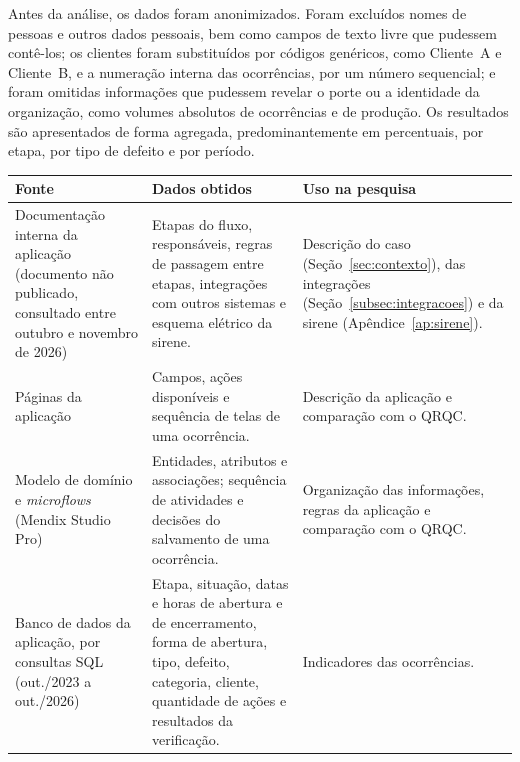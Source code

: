 Antes da análise, os dados foram anonimizados. Foram excluídos nomes de pessoas e outros dados pessoais, bem como campos de texto livre que pudessem contê-los; os clientes foram substituídos por códigos genéricos, como Cliente~A e Cliente~B, e a numeração interna das ocorrências, por um número sequencial; e foram omitidas informações que pudessem revelar o porte ou a identidade da organização, como volumes absolutos de ocorrências e de produção. Os resultados são apresentados de forma agregada, predominantemente em percentuais, por etapa, por tipo de defeito e por período.

\begin{quadro}[htb]
    \centering
    \caption{Fontes de evidência e dados coletados}
    \label{quad:fontes}
    \footnotesize
    \begin{tabularx}{\textwidth}{|>{\raggedright\arraybackslash}p{3.4cm}
                                    |>{\raggedright\arraybackslash}X
                                    |>{\raggedright\arraybackslash}p{3.4cm}|}
        \hline
        \textbf{Fonte} & \textbf{Dados obtidos} & \textbf{Uso na pesquisa} \\
        \hline
        Documentação interna da aplicação (documento não publicado, consultado entre outubro e novembro de 2026) & Etapas do fluxo, responsáveis, regras de passagem entre etapas, integrações com outros sistemas e esquema elétrico da sirene. & Descrição do caso (Seção~\ref{sec:contexto}), das integrações (Seção~\ref{subsec:integracoes}) e da sirene (Apêndice~\ref{ap:sirene}). \\
        \hline
        Páginas da aplicação & Campos, ações disponíveis e sequência de telas de uma ocorrência. & Descrição da aplicação e comparação com o QRQC. \\
        \hline
        Modelo de domínio e \textit{microflows} (Mendix Studio Pro) & Entidades, atributos e associações; sequência de atividades e decisões do salvamento de uma ocorrência. & Organização das informações, regras da aplicação e comparação com o QRQC. \\
        \hline
        Banco de dados da aplicação, por consultas SQL (out./2023 a out./2026) & Etapa, situação, datas e horas de abertura e de encerramento, forma de abertura, tipo, defeito, categoria, cliente, quantidade de ações e resultados da verificação. & Indicadores das ocorrências. \\
        \hline
    \end{tabularx}
\end{quadro}

